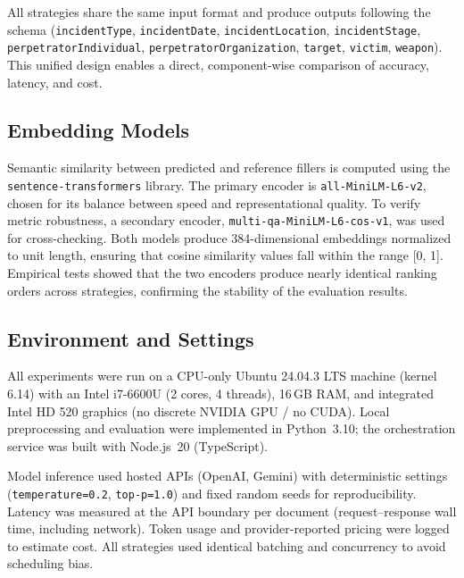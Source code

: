 All strategies share the same input format and produce outputs following the schema 
(\texttt{incidentType}, \texttt{incidentDate}, \texttt{incidentLocation}, \texttt{incidentStage}, \texttt{perpetratorIndividual}, \texttt{perpetratorOrganization}, \texttt{target}, \texttt{victim}, \texttt{weapon}).  
This unified design enables a direct, component-wise comparison of accuracy, latency, and cost.

\subsection{Embedding Models}

Semantic similarity between predicted and reference fillers is computed using the \texttt{sentence-transformers} library.  
The primary encoder is \texttt{all-MiniLM-L6-v2}, chosen for its balance between speed and representational quality.  
To verify metric robustness, a secondary encoder, \texttt{multi-qa-MiniLM-L6-cos-v1}, was used for cross-checking.  
Both models produce 384-dimensional embeddings normalized to unit length, ensuring that cosine similarity values fall within the range [0, 1].  
Empirical tests showed that the two encoders produce nearly identical ranking orders across strategies, confirming the stability of the evaluation results.

\subsection{Environment and Settings}

All experiments were run on a CPU-only Ubuntu 24.04.3 LTS machine (kernel 6.14) with an Intel i7-6600U (2 cores, 4 threads), 16\,GB RAM, and integrated Intel HD 520 graphics (no discrete NVIDIA GPU / no CUDA). Local preprocessing and evaluation were implemented in Python~3.10; the orchestration service was built with Node.js~20 (TypeScript).

Model inference used hosted APIs (OpenAI, Gemini) with deterministic settings (\texttt{temperature=0.2}, \texttt{top-p=1.0}) and fixed random seeds for reproducibility. Latency was measured at the API boundary per document (request--response wall time, including network). Token usage and provider-reported pricing were logged to estimate cost. All strategies used identical batching and concurrency to avoid scheduling bias.
